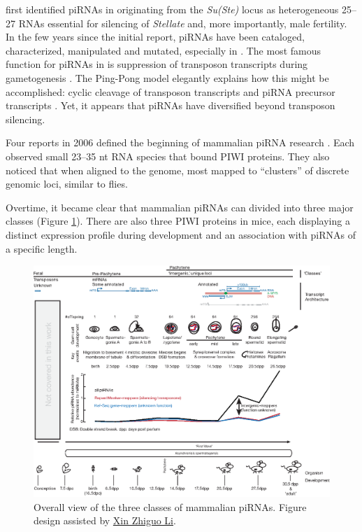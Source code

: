     \citet{Aravin2001} first identified piRNAs in \flies{} originating from the \textit{Su(Ste)} locus as heterogeneous 25--27 RNAs essential for silencing of \textit{Stellate} and, more importantly, male fertility. In the few years since the initial report, piRNAs have been cataloged, characterized, manipulated and mutated, especially in \flies{} \citep{Siomi2011,Luteijn2013,Hirose2014}. The most famous function for piRNAs in \flies{} is suppression of transposon transcripts during gametogenesis \citep{Malone2009}. The Ping-Pong model elegantly explains how this might be accomplished: cyclic cleavage of transposon transcripts and piRNA precursor transcripts \citep{Brennecke2007,Gunawardane2007}. Yet, it appears that piRNAs have diversified beyond transposon silencing.

    Four reports in 2006 defined the beginning of mammalian piRNA research \citep{Aravin2006,Grivna2006,Girard2006,Lau2006}. Each observed small 23--35 nt RNA species that bound PIWI proteins. They also noticed that when aligned to the genome, most mapped to ``clusters'' of discrete genomic loci, similar to flies.

    Overtime, it became clear that mammalian piRNAs can divided into three major classes (Figure \ref{Intro:fig:Mammalian piRNA classes}). There are also three PIWI proteins in mice, each displaying a distinct expression profile during development and an association with piRNAs of a specific length.

    \begin{landscape}
      \begin{figure} %
        \centering 
        \includegraphics{Figures/Intro/MammalianPiRNAClassesOverTime.eps}
        \caption[Different Classes of mammalian piRNAs]
        {
          Overall view of the three classes of mammalian piRNAs. Figure design assisted by \href{mailto:xin.li@umassmed.edu}{Xin Zhiguo Li}.
          } \label{Intro:fig:Mammalian piRNA classes}
        \end{figure}
      \end{landscape}

